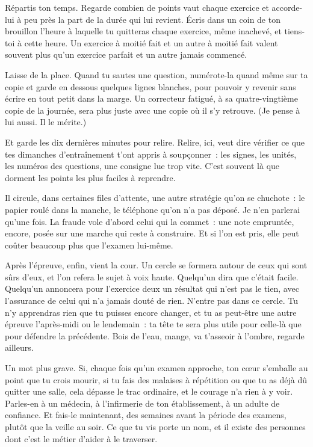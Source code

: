 \documentclass[10.5pt,twoside,openright]{book}
\begin{document}
Répartis ton temps. Regarde combien de points vaut chaque exercice et accorde-lui à peu près la part de la durée qui lui revient. Écris dans un coin de ton brouillon l’heure à laquelle tu quitteras chaque exercice, même inachevé, et tiens-toi à cette heure. Un exercice à moitié fait et un autre à moitié fait valent souvent plus qu’un exercice parfait et un autre jamais commencé.

Laisse de la place. Quand tu sautes une question, numérote-la quand même sur ta copie et garde en dessous quelques lignes blanches, pour pouvoir y revenir sans écrire en tout petit dans la marge. Un correcteur fatigué, à sa quatre-vingtième copie de la journée, sera plus juste avec une copie où il s’y retrouve. (Je pense à lui aussi. Il le mérite.)

Et garde les dix dernières minutes pour relire. Relire, ici, veut dire vérifier ce que tes dimanches d’entraînement t’ont appris à soupçonner : les signes, les unités, les numéros des questions, une consigne lue trop vite. C’est souvent là que dorment les points les plus faciles à reprendre.

Il circule, dans certaines files d’attente, une autre stratégie qu’on se chuchote : le papier roulé dans la manche, le téléphone qu’on n’a pas déposé. Je n’en parlerai qu’une fois. La fraude vole d’abord celui qui la commet : une note empruntée, encore, posée sur une marche qui reste à construire. Et si l’on est pris, elle peut coûter beaucoup plus que l’examen lui-même.

Après l’épreuve, enfin, vient la cour. Un cercle se formera autour de ceux qui sont sûrs d’eux, et l’on refera le sujet à voix haute. Quelqu’un dira que c’était facile. Quelqu’un annoncera pour l’exercice deux un résultat qui n’est pas le tien, avec l’assurance de celui qui n’a jamais douté de rien. N’entre pas dans ce cercle. Tu n’y apprendras rien que tu puisses encore changer, et tu as peut-être une autre épreuve l’après-midi ou le lendemain : ta tête te sera plus utile pour celle-là que pour défendre la précédente. Bois de l’eau, mange, va t’asseoir à l’ombre, regarde ailleurs.

Un mot plus grave. Si, chaque fois qu’un examen approche, ton cœur s’emballe au point que tu crois mourir, si tu fais des malaises à répétition ou que tu as déjà dû quitter une salle, cela dépasse le trac ordinaire, et le courage n’a rien à y voir. Parles-en à un médecin, à l’infirmerie de ton établissement, à un adulte de confiance. Et fais-le maintenant, des semaines avant la période des examens, plutôt que la veille au soir. Ce que tu vis porte un nom, et il existe des personnes dont c’est le métier d’aider à le traverser.
\end{document}
